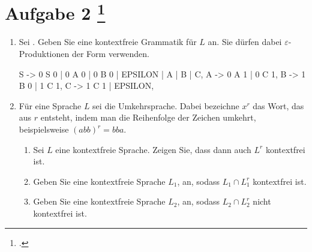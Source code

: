 \documentclass{lehramt-informatik-aufgabe}
\begin{document}
\section{Aufgabe 2
\footcite{examen:66115:2020:09}}

\begin{enumerate}


\item Sei . Geben Sie eine kontextfreie Grammatik für $L$
an. Sie dürfen dabei $\varepsilon$-Produktionen der Form
 verwenden.

\begin{liAntwort}
\begin{liProduktionsRegeln}
S -> 0 S 0 | 0 A 0 | 0 B 0 | EPSILON | A | B | C,
A -> 0 A 1 | 0 C 1,
B -> 1 B 0 | 1 C 1,
C -> 1 C 1 | EPSILON,
\end{liProduktionsRegeln}
\end{liAntwort}


\item Für eine Sprache $L$ sei  die
Umkehrsprache. Dabei bezeichne $x^r$ das Wort, das aus $r$ entsteht,
indem man die Reihenfolge der Zeichen umkehrt, beispielsweise $(abb)^r =
bba$.

\begin{enumerate}


\item Sei $L$ eine kontextfreie Sprache. Zeigen Sie, dass dann auch
$L^r$ kontextfrei ist.


\item Geben Sie eine kontextfreie Sprache $L_1$, an, sodass $L_1 \cap
L^r_1$ kontextfrei ist.


\item Geben Sie eine kontextfreie Sprache $L_2$, an, sodass $L_2 \cap
L^r_2$ nicht kontextfrei ist.

\end{enumerate}
\end{enumerate}
\end{document}
